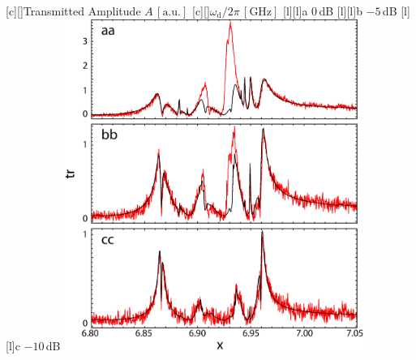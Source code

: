 

\figstyle
 [c][]{Transmitted Amplitude $A\,[\text{a.u.}]$}
 [c][]{$\omega_\text{d}/2\pi\, [\text{GHz}]$}
 [l][l]{{\panelstyle a } $0$\,dB}
 [l][l]{{\panelstyle b } $-5$\,dB}
 [l][l]{{\panelstyle c } $-10$\,dB}
 \includegraphics[height=4.25in]{thermal.eps}

